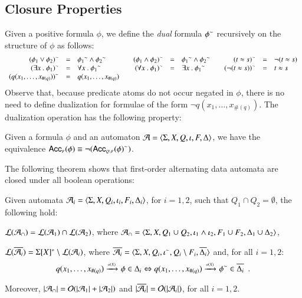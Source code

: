 \documentclass{llncs}
\begin{document}
\subsection{Closure Properties}

Given a positive formula $\phi$, we define the \emph{dual} formula
${\phi}^{\sim}$ recursively on the structure of $\phi$ as follows: 
\[\begin{array}{rclcrclcrcl}
{(\phi_1 \vee \phi_2)}^{\sim} & = & {\phi_1}^{\sim} \wedge {\phi_2}^{\sim} && 
{(\phi_1 \wedge \phi_2)}^{\sim} & = & {\phi_1}^{\sim} \wedge {\phi_2}^{\sim} &&
{(t \approx s)}^{\sim} & = & \neg(t \approx s) \\
{(\exists x ~.~ \phi_1)}^{\sim} & = & \forall x ~.~ {\phi_1}^{\sim} && 
{(\forall x ~.~ \phi_1)}^{\sim} & = & \exists x ~.~ {\phi_1}^{\sim} && 
{(\neg(t \approx s))}^{\sim} & = & t \approx s \\
{(q(x_1,\ldots,x_{\#(q)}))}^{\sim} & = & q(x_1,\ldots,x_{\#(q)})
\end{array}\]
Observe that, because predicate atoms do not occur negated in $\phi$,
there is no need to define dualization for formulae of the form $\neg
q(x_1,\ldots,x_{\#(q)})$. The dualization operation has the following
property:
\begin{lemma}\label{lemma:dual}
  Given a formula $\phi$ and an automaton
  $\mathcal{A}=\langle \Sigma,X,Q,\iota,F,\Delta \rangle$, we have the equivalence
  $\mathsf{Acc}_{\scriptscriptstyle{F}}({\phi}) \equiv \neg({\mathsf{Acc}_{\scriptscriptstyle{Q\setminus F}}({\phi})}^{\sim})$. 
\end{lemma}

The following theorem shows that first-order alternating data automata
are closed under all boolean operations: 

\begin{theorem}\label{thm:closure}
  Given automata $\mathcal{A}_i = \langle \Sigma,X,Q_i,\iota_i,F_i,\Delta_i \rangle$,
  for $i=1,2$, such that $Q_1 \cap Q_2 = \emptyset$, the following hold: 
  \begin{compactitem}
    \item\label{it1:closure} ${\mathcal L}({\mathcal{A}_\cap}) = {\mathcal L}({\mathcal{A}_1}) \cap {\mathcal L}({\mathcal{A}_2})$, where
      $\mathcal{A}_\cap = \langle \Sigma,X,Q_1 \cup Q_2, \iota_1 \wedge \iota_2,
      F_1 \cup F_2, \Delta_1 \cup \Delta_2 \rangle$, 
    \item\label{it2:closure} ${\mathcal L}({\overline{\mathcal{A}_i}}) = \Sigma[X]^* \setminus
      {\mathcal L}({\mathcal{A}_i})$, where $\overline{\mathcal{A}_i} =
      \langle \Sigma,X,Q_i,{\iota}^{\sim},Q_i\setminus
        F_i,\overline{\Delta_i} \rangle$ and, for all
      $i=1,2$: \[q(x_1,\ldots,x_{\#(q)}) \xrightarrow{{\scriptscriptstyle a(X)}}_{{\scriptstyle }} \phi \in
      \Delta_i \Leftrightarrow q(x_1,\ldots,x_{\#(q)}) \xrightarrow{{\scriptscriptstyle a(X)}}_{{\scriptstyle }} {\phi}^{\sim}
      \in \overline{\Delta_i} \enspace.\]
  \end{compactitem}
  Moreover, ${|{\mathcal{A}_\cap}|} = \mathcal{O}({{|{\mathcal{A}_1}|}+{|{\mathcal{A}_2}|}})$ and
  ${|{\overline{\mathcal{A}_i}}|} = \mathcal{O}({{|{\mathcal{A}_i}|}})$, for all $i=1,2$.
\end{theorem}
\proof{\qed}

 

\end{document}
